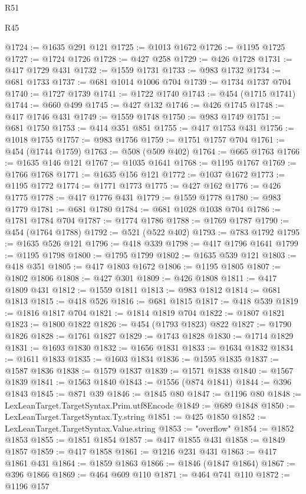\begin{lexlean}{R51}
\begin{lexlean}{R45}
\begin{coremodule}
{{{{{{{{{{{{{{{{{{{{{{{{{{{{{{{{{{{{{{{{{{{{{{{{{{{{{{{{{{{{{{{{{{{{{{{{{{{{{{{{{{{{{{{{{{{@1724 := @1635 @291 @121
@1725 := @1013 @1672
@1726 := @1195 @1725
@1727 := @1724 @1726
@1728 := @427 @258
@1729 := @426 @1728
@1731 := @417 @1729 @431
@1732 := @1559 @1731
@1733 := @983 @1732
@1734 := @681 @1733
@1737 := @681 @1014 @1006 @704
@1739 := @1734 @1737 @704
@1740 := @1727 @1739
@1741 := @1722 @1740
@1743 := @454 (@1715 @1741)
@1744 := @660 @499
@1745 := @427 @132
@1746 := @426 @1745
@1748 := @417 @1746 @431
@1749 := @1559 @1748
@1750 := @983 @1749
@1751 := @681 @1750
@1753 := @414 @351 @851
@1755 := @417 @1753 @431
@1756 := @1018 @1755
@1757 := @983 @1756
@1759 := @1751 @1757 @704
@1761 := @454 (@1744 @1759)
@1763 := @508 (@509 @402)
@1764 := @665 @1763
@1766 := @1635 @146 @121
@1767 := @1035 @1641
@1768 := @1195 @1767
@1769 := @1766 @1768
@1771 := @1635 @156 @121
@1772 := @1037 @1672
@1773 := @1195 @1772
@1774 := @1771 @1773
@1775 := @427 @162
@1776 := @426 @1775
@1778 := @417 @1776 @431
@1779 := @1559 @1778
@1780 := @983 @1779
@1781 := @681 @1780
@1784 := @681 @1028 @1038 @704
@1786 := @1781 @1784 @704
@1787 := @1774 @1786
@1788 := @1769 @1787
@1790 := @454 (@1764 @1788)
@1792 := @521 (@522 @402)
@1793 := @783 @1792
@1795 := @1635 @526 @121
@1796 := @418 @339
@1798 := @417 @1796 @1641
@1799 := @1195 @1798
@1800 := @1795 @1799
@1802 := @1635 @539 @121
@1803 := @418 @351
@1805 := @417 @1803 @1672
@1806 := @1195 @1805
@1807 := @1802 @1806
@1808 := @427 @301
@1809 := @426 @1808
@1811 := @417 @1809 @431
@1812 := @1559 @1811
@1813 := @983 @1812
@1814 := @681 @1813
@1815 := @418 @526
@1816 := @681 @1815
@1817 := @418 @539
@1819 := @1816 @1817 @704
@1821 := @1814 @1819 @704
@1822 := @1807 @1821
@1823 := @1800 @1822
@1826 := @454 (@1793 @1823) @822
@1827 := @1790 @1826
@1828 := @1761 @1827
@1829 := @1743 @1828
@1830 := @1714 @1829
@1831 := @1693 @1830
@1832 := @1656 @1831
@1833 := @1634 @1832
@1834 := @1611 @1833
@1835 := @1603 @1834
@1836 := @1595 @1835
@1837 := @1587 @1836
@1838 := @1579 @1837
@1839 := @1571 @1838
@1840 := @1567 @1839
@1841 := @1563 @1840
@1843 := @1556 (@874 @1841)
@1844 := @396 @1843
@1845 := @871 @39
@1846 := @1845 @80
@1847 := @1196 @80
@1848 := LexLeanTarget.TargetSyntax.Prim.utf8Encode
@1849 := @689 @1848
@1850 := LexLeanTarget.TargetSyntax.Ty.string
@1851 := @425 @1850
@1852 := LexLeanTarget.TargetSyntax.Value.string
@1853 := "overflow"
@1854 := @1852 @1853
@1855 := @1851 @1854
@1857 := @417 @1855 @431
@1858 := @1849 @1857
@1859 := @417 @1858
@1861 := @1216 @231 @431
@1863 := @417 @1861 @431
@1864 := @1859 @1863
@1866 := @1846 (@1847 @1864)
@1867 := @396 @1866
@1869 := @464 @609 @110
@1871 := @464 @741 @110
@1872 := @1196 @157
}}}}}}}}}}}}}}}}}}}}}}}}}}}}}}}}}}}}}}}}}}}}}}}}}}}}}}}}}}}}}}}}}}}}}}}}}}}}}}}}}}}}}}}}}}}
\end{coremodule}
\end{lexlean}
\end{lexlean}

